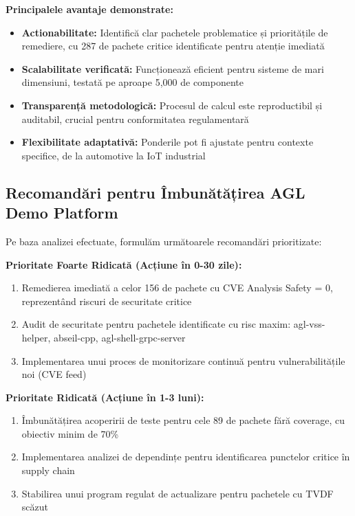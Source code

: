 \documentclass[12pt,a4paper]{article}
\begin{document}
\textbf{Principalele avantaje demonstrate:}

\begin{itemize}
\item \textbf{Actionabilitate:} Identifică clar pachetele problematice și prioritățile de remediere, cu 287 de pachete critice identificate pentru atenție imediată
\item \textbf{Scalabilitate verificată:} Funcționează eficient pentru sisteme de mari dimensiuni, testată pe aproape 5,000 de componente
\item \textbf{Transparență metodologică:} Procesul de calcul este reproductibil și auditabil, crucial pentru conformitatea regulamentară
\item \textbf{Flexibilitate adaptativă:} Ponderile pot fi ajustate pentru contexte specifice, de la automotive la IoT industrial
\end{itemize}

\subsection{Recomandări pentru Îmbunătățirea AGL Demo Platform}

Pe baza analizei efectuate, formulăm următoarele recomandări prioritizate:

\textbf{Prioritate Foarte Ridicată (Acțiune în 0-30 zile):}
\begin{enumerate}
\item Remedierea imediată a celor 156 de pachete cu CVE Analysis Safety = 0, reprezentând riscuri de securitate critice
\item Audit de securitate pentru pachetele identificate cu risc maxim: agl-vss-helper, abseil-cpp, agl-shell-grpc-server
\item Implementarea unui proces de monitorizare continuă pentru vulnerabilitățile noi (CVE feed)
\end{enumerate}

\textbf{Prioritate Ridicată (Acțiune în 1-3 luni):}
\begin{enumerate}
\item Îmbunătățirea acoperirii de teste pentru cele 89 de pachete fără coverage, cu obiectiv minim de 70\%
\item Implementarea analizei de dependințe pentru identificarea punctelor critice în supply chain
\item Stabilirea unui program regulat de actualizare pentru pachetele cu TVDF scăzut
\end{enumerate}
\end{document}
